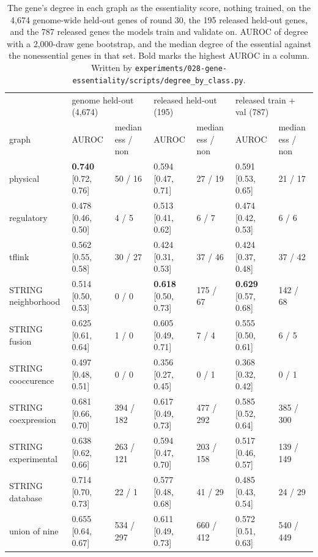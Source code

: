 \begin{table}[H]
  \centering
  \scriptsize
  \caption[Degree as the score]{The gene's degree in each graph as the essentiality score, nothing trained, on the 4,674 genome-wide held-out genes of round 30, the 195 released held-out genes, and the 787 released genes the models train and validate on. AUROC of degree with a 2,000-draw gene bootstrap, and the median degree of the essential against the nonessential genes in that set. Bold marks the highest AUROC in a column. Written by \texttt{experiments/028-gene-essentiality/scripts/degree\_by\_class.py}.}
  \label{tab:degree-by-class}
  \begin{tabular}{@{}lllllll@{}}
    \hline
    & \multicolumn{2}{l}{genome held-out (4,674)} & \multicolumn{2}{l}{released held-out (195)} & \multicolumn{2}{l}{released train + val (787)} \\
    graph & AUROC & median ess / non & AUROC & median ess / non & AUROC & median ess / non \\
    \hline
    physical & \textbf{0.740} [0.72, 0.76] & 50 / 16 & 0.594 [0.47, 0.71] & 27 / 19 & 0.591 [0.53, 0.65] & 21 / 17 \\
    regulatory & 0.478 [0.46, 0.50] & 4 / 5 & 0.513 [0.41, 0.62] & 6 / 7 & 0.474 [0.42, 0.53] & 6 / 6 \\
    tflink & 0.562 [0.55, 0.58] & 30 / 27 & 0.424 [0.31, 0.53] & 37 / 46 & 0.424 [0.37, 0.48] & 37 / 42 \\
    STRING neighborhood & 0.514 [0.50, 0.53] & 0 / 0 & \textbf{0.618} [0.50, 0.73] & 175 / 67 & \textbf{0.629} [0.57, 0.68] & 142 / 68 \\
    STRING fusion & 0.625 [0.61, 0.64] & 1 / 0 & 0.605 [0.49, 0.71] & 7 / 4 & 0.555 [0.50, 0.61] & 6 / 5 \\
    STRING cooccurence & 0.497 [0.48, 0.51] & 0 / 0 & 0.356 [0.27, 0.45] & 0 / 1 & 0.368 [0.32, 0.42] & 0 / 1 \\
    STRING coexpression & 0.681 [0.66, 0.70] & 394 / 182 & 0.617 [0.49, 0.73] & 477 / 292 & 0.585 [0.52, 0.64] & 385 / 300 \\
    STRING experimental & 0.638 [0.62, 0.66] & 263 / 121 & 0.594 [0.47, 0.70] & 203 / 158 & 0.517 [0.46, 0.57] & 139 / 149 \\
    STRING database & 0.714 [0.70, 0.73] & 22 / 1 & 0.577 [0.48, 0.68] & 41 / 29 & 0.485 [0.43, 0.54] & 24 / 29 \\
    union of nine & 0.655 [0.64, 0.67] & 534 / 297 & 0.611 [0.49, 0.73] & 660 / 412 & 0.572 [0.51, 0.63] & 540 / 449 \\
    \hline
  \end{tabular}
\end{table}
